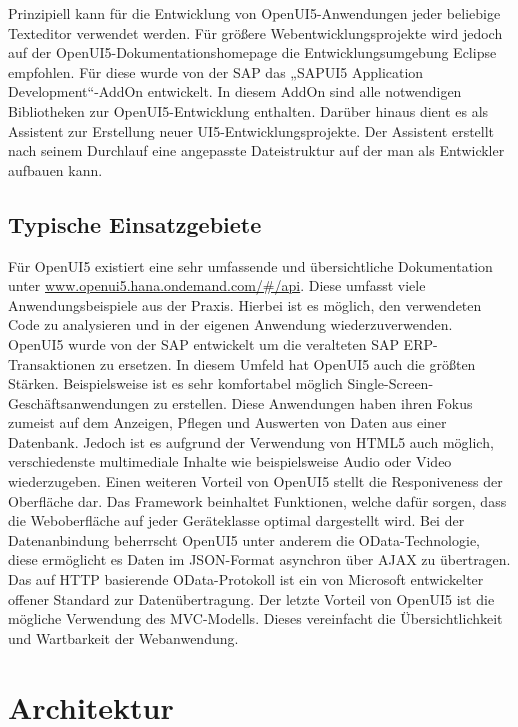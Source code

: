 Prinzipiell kann für die Entwicklung von OpenUI5-Anwendungen jeder beliebige Texteditor verwendet werden. Für größere Webentwicklungsprojekte wird jedoch auf der OpenUI5-Dokumentationshomepage die Entwicklungsumgebung Eclipse empfohlen. Für diese wurde von der SAP das „SAPUI5 Application Development“-AddOn entwickelt. In diesem AddOn sind alle notwendigen Bibliotheken zur OpenUI5-Entwicklung enthalten. Darüber hinaus dient es als Assistent zur Erstellung neuer UI5-Entwicklungsprojekte. Der Assistent erstellt nach seinem Durchlauf eine angepasste Dateistruktur auf der man als Entwickler aufbauen kann.\autocites[vgl.][109\psqq]{Antolovic2014}


\subsection{Typische Einsatzgebiete}

Für OpenUI5 existiert eine sehr umfassende und übersichtliche Dokumentation unter \url{www.openui5.hana.ondemand.com/#/api}. Diese umfasst viele Anwendungsbeispiele aus der Praxis. Hierbei ist es möglich, den verwendeten Code zu analysieren und in der eigenen Anwendung wiederzuverwenden. OpenUI5 wurde von der SAP entwickelt um die veralteten SAP ERP-Transaktionen zu ersetzen. In diesem Umfeld hat OpenUI5 auch die größten Stärken. Beispielsweise ist es sehr komfortabel möglich Single-Screen-Geschäftsanwendungen zu erstellen. Diese Anwendungen haben ihren Fokus zumeist auf dem Anzeigen, Pflegen und Auswerten von Daten aus einer Datenbank. Jedoch ist es aufgrund der Verwendung von HTML5 auch möglich, verschiedenste multimediale Inhalte wie beispielsweise Audio oder Video wiederzugeben. Einen weiteren Vorteil von OpenUI5 stellt die Responiveness der Oberfläche dar. Das Framework beinhaltet Funktionen, welche dafür sorgen, dass die Weboberfläche auf jeder Geräteklasse optimal dargestellt wird. Bei der Datenanbindung beherrscht OpenUI5 unter anderem die OData-Technologie, diese ermöglicht es Daten im JSON-Format asynchron über AJAX zu übertragen. Das auf HTTP basierende OData-Protokoll ist ein von Microsoft entwickelter offener Standard zur Datenübertragung. Der letzte Vorteil von OpenUI5 ist die mögliche Verwendung des MVC-Modells. Dieses vereinfacht die Übersichtlichkeit und Wartbarkeit der Webanwendung.\autocites[vgl.][26\psqq]{Magnucki2017}


\section{Architektur}

